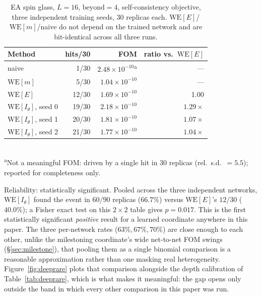 \documentclass[a4paper,fleqn]{cas-sc}
\begin{document}
	\begin{table}[H]
		\centering\small
		\caption{EA spin glass, $L=16$, $\mathrm{beyond}=4$, self-consistency objective,
			three independent training seeds, 30 replicas each. $\mathrm{WE}[E]$/$\mathrm{WE}[m]$/naive
			do not depend on the trained network and are bit-identical across all three runs.}
		\label{tab:selfconsistdeep}
		\begin{tabular}{lrrr}
			\toprule
			Method & hits/30 & FOM & ratio vs.\ $\mathrm{WE}[E]$ \\
			\midrule
			naive & 1/30 & $2.48\times10^{-10}$\textsuperscript{a} & --- \\
			$\mathrm{WE}[m]$ & 5/30 & $1.04\times10^{-10}$ & --- \\
			$\mathrm{WE}[E]$ & 12/30 & $1.69\times10^{-10}$ & 1.00 \\
			$\mathrm{WE}[I_\theta]$, seed 0 & 19/30 & $2.18\times10^{-10}$ & $1.29\times$ \\
			$\mathrm{WE}[I_\theta]$, seed 1 & 20/30 & $1.81\times10^{-10}$ & $1.07\times$ \\
			$\mathrm{WE}[I_\theta]$, seed 2 & 21/30 & $1.77\times10^{-10}$ & $1.04\times$ \\
			\bottomrule
		\end{tabular}
		\\[2pt]
		{\footnotesize\textsuperscript{a}Not a meaningful FOM: driven by a single hit in 30
			replicas (rel.\ s.d.\ $=5.5$); reported for completeness only.}
	\end{table}
	
	Reliability: statistically significant. Pooled across the three independent
	networks, $\mathrm{WE}[I_\theta]$ found the event in $60/90$ replicas ($66.7\%$) versus
	$\mathrm{WE}[E]$'s $12/30$ ($40.0\%$); a Fisher exact test on this $2\times2$ table gives
	$p=0.017$. This is the first statistically significant \emph{positive} result for a
	learned coordinate anywhere in this paper. The three per-network rates ($63\%, 67\%,
	70\%$) are close enough to each other, unlike the milestoning coordinate's wide
	net-to-net FOM swings (\S\ref{sec:milestone}), that pooling them as a single binomial
	comparison is a reasonable approximation rather than one masking real heterogeneity.
	Figure~\ref{fig:deeprare} plots that comparison alongside the depth calibration of
	Table~\ref{tab:deeprare}, which is what makes it meaningful: the gap opens only outside
	the band in which every other comparison in this paper was run.
	
\end{document}
